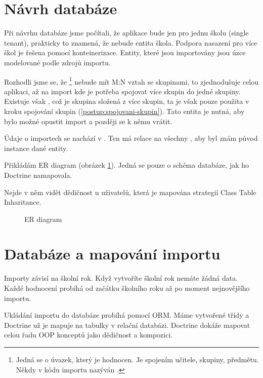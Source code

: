 \section{Návrh databáze}

Při návrhu databáze jsme počítali, že aplikace bude jen pro jednu školu (single tenant), prakticky to znamená, že nebude entita škola. 
Podpora nasazení pro více škol je řešena pomocí konteinerizace.
Entity, které jsou importovány jsou úzce modelované podle zdrojů importu.

Rozhodli jsme se, že \footnote{Jedná se o úvazek, který je hodnocen. Je spojením učitele, skupiny, předmětu. Někdy v kódu importu nazýván .} 
nebude mít M:N vztah se skupinami, to zjednodušuje celou aplikaci, až na import kde je potřeba spojovat více skupin do jedné skupiny.
Existuje však , což je skupina složená z více skupin, ta je však pouze použita v kroku spojování skupin (\ref{postup:spojovani-skupin}).
Tato entita je nutná, aby bylo možné opustit import a později se k němu vrátit.

Údaje o importech se nachází v . Ten má relace na všechny , aby byl znám původ instance dané entity.

Přikládám ER diagram (obrázek \ref{postup:er-diagram}). Jedná se pouze o schéma databáze, jak ho Doctrine namapovala.

Nejde v něm vidět dědičnost u uživatelů, která je mapována strategií Class Table Inharitance\cite{P-of-EAA}.





\begin{figure}
	\centering
  \resizebox{0.95\textwidth}{!}{\huge{}}
  \caption{ER diagram}
  \label{postup:er-diagram}
\end{figure}



\section{Databáze a mapování importu}

Importy závisí na školní rok. Když vytvoříte školní rok nemáte žádná data. Každé hodnocení probíhá od začátku školního roku až po moment nejnovějšího importu.

Ukládání importu do databáze probíhá pomocí ORM. Máme vytvořené třídy a Doctrine už je mapuje na tabulky v relační databázi. Doctrine dokáže mapovat celou řadu OOP konceptů jako dědičnost a kompozici.

